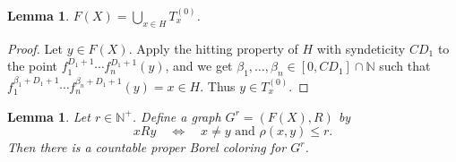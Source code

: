 \documentclass[11pt, reqno, a4paper]{amsart}
\newtheorem{lemma}[theorem]{Lemma}
\theoremstyle{definition}
\theoremstyle{plain}
\begin{document}
\begin{lemma}\label{lem:cover}
    $F(X)=\bigcup_{x\in H}T^{(0)}_{x}$.
\end{lemma}

\begin{proof}
    Let $y\in F(X)$. Apply the hitting property of $H$ with syndeticity $CD_1$ to the point $f_1^{D_1+1}\cdots f_n^{D_1+1}(y)$, and we get $\beta_1,\dots, \beta_n\in [0,CD_1]\cap\mathbb{N}$ such that $f_1^{\beta_1+D_1+1}\cdots f_n^{\beta_n+D_1+1}(y)=x\in H$. Thus $y\in T_x^{(0)}$.
\end{proof}

\begin{lemma}
     \itshape
     Let $r\in\mathbb N^+$. Define a graph $G^r=(F(X),R)$ by
$$
xRy \quad\Longleftrightarrow\quad x\neq y\text{ and }\rho(x,y)\le r.
$$
Then there is a countable proper Borel coloring for $G^r$.
\end{lemma}
\end{document}
